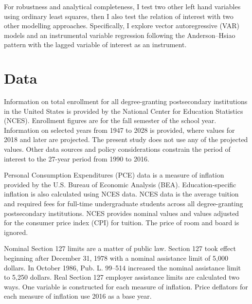\documentclass[review]{elsarticle}
\begin{document}
    For robustness and analytical completeness, I test two other left hand variables using ordinary least squares,
    then I also test the relation of interest with two other modelling approaches.
    Specifically, I explore vector autoregressive (VAR) models
    and an instrumental variable regression following the Anderson–Hsiao pattern\cite{anderson1981estimation} with the lagged variable of interest as an instrument.

    \section{Data}

    Information on total enrollment for all degree-granting postsecondary institutions in the United States
    is provided by the National Center for Education Statistics (NCES)\cite{nces_2019}.
    Enrollment figures are for the fall semester of the school year.
    Information on selected years from 1947 to 2028 is provided, where values for 2018 and later are projected.
    The present study does not use any of the projected values.
    Other data sources and policy considerations constrain the period of interest to the 27-year period from 1990 to 2016.    

    Personal Consumption Expenditures (PCE) data is a measure of inflation provided by the U.S. Bureau of Economic Analysis (BEA)\cite{bea_2020}.
    Education-specific inflation is also calculated using NCES data\cite{nces_2017}.
    NCES data is the average tuition and required fees for full-time undergraduate students across all degree-granting postsecondary institutions.
    NCES provides nominal values and values adjusted for the consumer price index (CPI) for tuition.
    The price of room and board is ignored.

    Nominal Section 127 limits are a matter of public law.
    Section 127 took effect beginning after December 31, 1978 with a nominal assistance limit of 5,000 dollars\cite{plaw95_600_1978}.
    In October 1986, Pub. L. 99–514 increased the nominal assistance limit to 5,250 dollars\cite{plaw99_514_1986}.
    Real Section 127 employer assistance limits are calculated two ways.
    One variable is constructed for each measure of inflation.
    Price deflators for each measure of inflation use 2016 as a base year.
    
\end{document}
